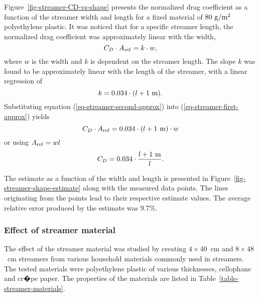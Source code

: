 Figure~\ref{fig-streamer-CD-vs-shape} presents the normalized drag
coefficient as a function of the streamer width and length for a fixed
material of $\rm80~g/m^2$ polyethylene plastic.  It was noticed that
for a specific streamer length, the normalized drag coefficient was
approximately linear with the width,
%
\begin{equation}
C_D \cdot A_{\rm ref} = k\cdot w,
\label{eq-streamer-first-approx}
\end{equation}
%
where $w$ is the width and $k$ is dependent on the streamer length.
The slope $k$ was found to be approximately linear with
the length of the streamer, with a linear regression of
%
\begin{equation}
k = 0.034 \cdot (l+\rm 1~m).
\label{eq-streamer-second-approx}
\end{equation}
%
Substituting equation (\ref{eq-streamer-second-approx}) into
(\ref{eq-streamer-first-approx}) yields
%
\begin{equation}
C_D \cdot A_{\rm ref} = 0.034 \cdot (l+{\rm 1~m})\cdot w
\label{eq-streamer-estimate}
\end{equation}
%
or using $A_{\rm ref} = wl$
%
\begin{equation}
C_D = 0.034 \cdot \frac{l+\rm 1~m}{l}.
\label{eq-streamer-shape-estimate}
\end{equation}


The estimate as a function of the width and length is presented in 
Figure~\ref{fig-streamer-shape-estimate} along with the measured data
points.  The lines originating from the points lead to their
respective estimate values.  The average relative error produced by
the estimate was 9.7\%.


\subsubsection*{Effect of streamer material}



The effect of the streamer material was studied by creating
$4\times40$~cm and $8\times48$~cm streamers from various household
materials commonly used in streamers.  The tested materials were
polyethylene plastic of various thicknesses, cellophane and cr�pe
paper.  The properties of the materials are listed in
Table~\ref{table-streamer-materials}. 


